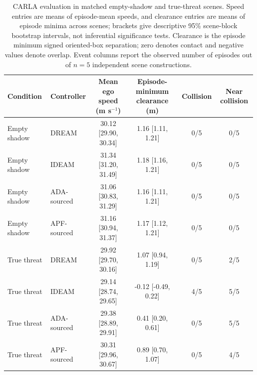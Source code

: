 \begin{table}[t]
\centering
\caption{CARLA evaluation in matched empty-shadow and true-threat scenes. Speed entries are means of episode-mean speeds, and clearance entries are means of episode minima across scenes; brackets give descriptive 95\% scene-block bootstrap intervals, not inferential significance tests. Clearance is the episode minimum signed oriented-box separation; zero denotes contact and negative values denote overlap. Event columns report the observed number of episodes out of $n=5$ independent scene constructions.}
\label{tab:carla-shadow-profiles}
\begin{tabular}{llcccc}
\toprule
Condition & Controller & Mean ego speed (m s$^{-1}$) & Episode-minimum clearance (m) & Collision & Near collision \\
\midrule
Empty shadow & DREAM & 30.12 [29.90, 30.34] & 1.16 [1.11, 1.21] & 0/5 & 0/5 \\
Empty shadow & IDEAM & 31.34 [31.20, 31.49] & 1.18 [1.16, 1.21] & 0/5 & 0/5 \\
Empty shadow & ADA-sourced & 31.06 [30.83, 31.29] & 1.16 [1.11, 1.21] & 0/5 & 0/5 \\
Empty shadow & APF-sourced & 31.16 [30.94, 31.37] & 1.17 [1.12, 1.21] & 0/5 & 0/5 \\
\midrule
True threat & DREAM & 29.92 [29.70, 30.16] & 1.07 [0.94, 1.19] & 0/5 & 2/5 \\
True threat & IDEAM & 29.14 [28.74, 29.65] & -0.12 [-0.49, 0.22] & 4/5 & 5/5 \\
True threat & ADA-sourced & 29.38 [28.89, 29.91] & 0.41 [0.20, 0.61] & 0/5 & 5/5 \\
True threat & APF-sourced & 30.31 [29.96, 30.67] & 0.89 [0.70, 1.07] & 0/5 & 4/5 \\
\bottomrule
\end{tabular}
\end{table}
